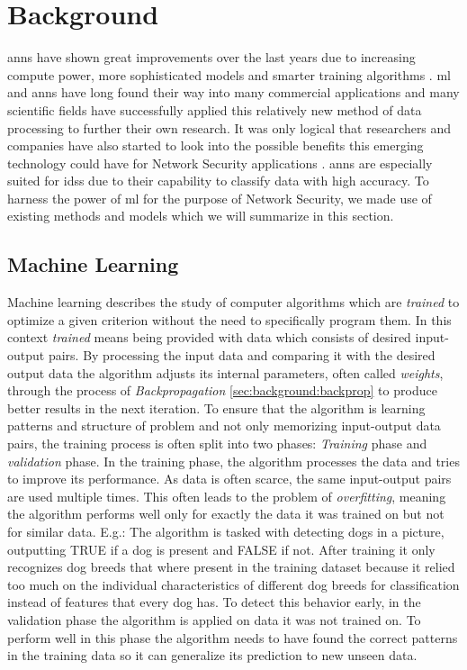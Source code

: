 \chapter{Background} \label{sec:background}

\glspl{ann} have shown great improvements over the last years due to increasing compute power, more sophisticated models and smarter training algorithms . \gls{ml} and \glspl{ann} have long found their way into many commercial applications and many scientific fields have successfully applied this relatively new method of data processing to further their own research.  It was only logical that researchers and companies have also started to look into the possible benefits this emerging technology could have for Network Security applications . \glspl{ann} are especially suited for \glspl{ids} due to their capability to classify data with high accuracy. To harness the power of \gls{ml} for the purpose of Network Security, we made use of existing methods and models which we will summarize in this section.

\section{Machine Learning} \label{sec:background:ml}

Machine learning describes the study of computer algorithms which are \textit{trained} to optimize a given criterion without the need to specifically program them. In this context \textit{trained} means being provided with data which consists of desired input-output pairs. By processing the input data and comparing it with the desired output data the algorithm adjusts its internal parameters, often called \textit{weights}, through the process of \textit{Backpropagation} \ref{sec:background:backprop} to produce better results in the next iteration. To ensure that the algorithm is learning patterns and structure of problem and not only memorizing input-output data pairs, the training process is often split into two phases: \textit{Training} phase and \textit{validation} phase. In the training phase, the algorithm processes the data and tries to improve its performance. As data is often scarce, the same input-output pairs are used multiple times. This often leads to the problem of \textit{overfitting}, meaning the algorithm performs well only for exactly the data it was trained on but not for similar data. E.g.: The algorithm is tasked with detecting dogs in a picture, outputting TRUE if a dog is present and FALSE if not. After training it only recognizes dog breeds that where present in the training dataset because it relied too much on the individual characteristics of different dog breeds for classification instead of features that every dog has. To detect this behavior early, in the validation phase the algorithm is applied on data it was not trained on. To perform well in this phase the algorithm needs to have found the correct patterns in the training data so it can generalize its prediction to new unseen data.   

